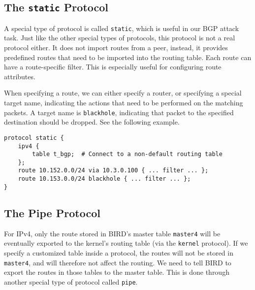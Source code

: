 \begin{lstlisting}

\end{lstlisting}
 

\subsection{The \texttt{static} Protocol} 

A special type of protocol is called \texttt{static}, which is 
useful in our BGP attack task. Just like the other special
types of protocols, this protocol is not a real protocol either.
It does not import routes from a peer, instead, it provides 
predefined routes that need to be imported into 
the routing table. Each route can have a route-specific
filter. This is especially useful for configuring route attributes. 

When specifying a route, we can either specify a router, or 
specifying a special target name, indicating the actions 
that need to be performed on the matching packets. 
A target name is \texttt{blackhole},
indicating that packet to the specified destination should be 
dropped. See the following example.

\begin{lstlisting}
protocol static {
    ipv4 {
        table t_bgp;  # Connect to a non-default routing table
    };
    route 10.152.0.0/24 via 10.3.0.100 { ... filter ... };
    route 10.153.0.0/24 blackhole { ... filter ... };
}
\end{lstlisting}



\subsection{The Pipe Protocol} 

For IPv4, only the route stored in BIRD's master table \texttt{master4} will be eventually
exported to the kernel's routing table (via the \texttt{kernel} protocol). 
If we specify a customized table
inside a protocol, the routes will not be stored in \texttt{master4},
and will therefore not affect the routing. We need to tell BIRD
to export the routes in those tables to the master table. This is done 
through another special type of protocol called \texttt{pipe}. 

